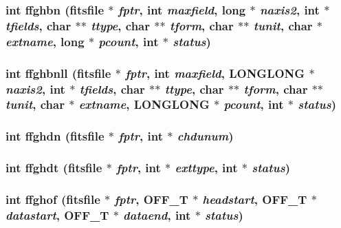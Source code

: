 \subsubsection{\setlength{\rightskip}{0pt plus 5cm}int ffghbn (\bf{fitsfile} $\ast$ {\em fptr}, int {\em maxfield}, long $\ast$ {\em naxis2}, int $\ast$ {\em tfields}, char $\ast$$\ast$ {\em ttype}, char $\ast$$\ast$ {\em tform}, char $\ast$$\ast$ {\em tunit}, char $\ast$ {\em extname}, long $\ast$ {\em pcount}, int $\ast$ {\em status})}\label{fitsio_8h_bc0f689fe3484d2f9c8a9703b058b342}


\subsubsection{\setlength{\rightskip}{0pt plus 5cm}int ffghbnll (\bf{fitsfile} $\ast$ {\em fptr}, int {\em maxfield}, \bf{LONGLONG} $\ast$ {\em naxis2}, int $\ast$ {\em tfields}, char $\ast$$\ast$ {\em ttype}, char $\ast$$\ast$ {\em tform}, char $\ast$$\ast$ {\em tunit}, char $\ast$ {\em extname}, \bf{LONGLONG} $\ast$ {\em pcount}, int $\ast$ {\em status})}\label{fitsio_8h_63346aca0b8254ae989a8c62e45a532a}


\subsubsection{\setlength{\rightskip}{0pt plus 5cm}int ffghdn (\bf{fitsfile} $\ast$ {\em fptr}, int $\ast$ {\em chdunum})}\label{fitsio_8h_b931369499769d33e907da0a87a5f4b6}


\subsubsection{\setlength{\rightskip}{0pt plus 5cm}int ffghdt (\bf{fitsfile} $\ast$ {\em fptr}, int $\ast$ {\em exttype}, int $\ast$ {\em status})}\label{fitsio_8h_b6397953ca4869d2d95466d0b69fab90}


\subsubsection{\setlength{\rightskip}{0pt plus 5cm}int ffghof (\bf{fitsfile} $\ast$ {\em fptr}, OFF\_\-T $\ast$ {\em headstart}, OFF\_\-T $\ast$ {\em datastart}, OFF\_\-T $\ast$ {\em dataend}, int $\ast$ {\em status})}\label{fitsio_8h_ce0a6f7eeaab4cc5b53d42a9bcab393b}


